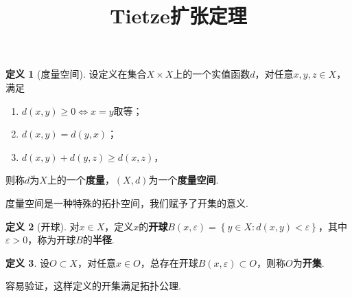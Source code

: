 \documentclass[12pt]{ctexart}
\title{\vspace{-2em}\textbf{Tietze扩张定理}\vspace{-2em}}
\date{ }
\theoremstyle{definition}
\newtheorem{definition}{定义}
\theoremstyle{plain}
\begin{document}
	\maketitle
	\begin{definition}[度量空间]
		设定义在集合$X\times X$上的一个实值函数$d$，对任意$x,y,z\in X$，满足
		\begin{enumerate}
			\item $d(x,y)\geqslant 0\iff x=y$取等；
			\item $d(x,y)=d(y,x)$；
			\item $d(x,y)+d(y,z)\geqslant d(x,z)$，
		\end{enumerate}
		则称$d$为$X$上的一个\textbf{度量}，$(X,d)$为一个\textbf{度量空间}.
	\end{definition}
	度量空间是一种特殊的拓扑空间，我们赋予了开集的意义. 
	\begin{definition}[开球]
		对$x\in X$，定义$x$的\textbf{开球}$B(x,\varepsilon)=\left\{y\in X:d(x,y)<\varepsilon\right\}$，其中$\varepsilon>0$，称为开球$B$的\textbf{半径}.
	\end{definition}
	\begin{definition}
		设$O\subset X$，对任意$x\in O$，总存在开球$B(x,\varepsilon)\subset O$，则称$O$为\textbf{开集}.
	\end{definition}
	容易验证，这样定义的开集满足拓扑公理.
	
\end{document}
